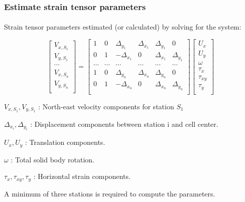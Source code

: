 \begin{frame}
 \frametitle{Estimate strain tensor parameters}
 \framesubtitle{}
 \label{ch2:}
 
 Strain tensor parameters estimated (or calculated) by solving for the system:
 
 \[
  \begin{bmatrix}
    V_{x,S_1} \\ 
    V_{y,S_1} \\ 
    \cdots \\ 
    V_{x,S_n} \\ 
    V_{y,S_n} \\ 
  \end{bmatrix}
  =
  \begin{bmatrix}
    1 & 0 & \Delta_{y_1}  & \Delta_{x_1} & \Delta_{y_1} & 0 \\
    0 & 1 & -\Delta_{x_1} &  0           & \Delta_{x_1} & \Delta_{y_1} \\
    \cdots & \cdots & \cdots & \cdots & \cdots & \cdots \\
    1 & 0 & \Delta_{y_n}  & \Delta_{x_n} & \Delta_{y_n} & 0 \\
    0 & 1 & -\Delta_{x_n} &  0           & \Delta_{x_n} & \Delta_{y_n} \\
  \end{bmatrix}
  \begin{bmatrix}
    U_{x} \\ 
    U_{y} \\ 
    \omega \\ 
    \tau_{x} \\ 
    \tau_{xy} \\ 
    \tau_{y} \\ 
  \end{bmatrix}
  \]
  
  $V_{x,S_1}, V_{y,S_1}$ : North-east velocity components for station $S_1$
  
  $\Delta_{x_i}, \Delta_{y_i}$ : Displacement components between station i and cell center.
  
  $ U_{x},  U_{y} $ : Translation components.
  
  $\omega$ : Total solid body rotation.
  
  $ \tau_{x}, \tau_{xy}, \tau_{y} $ : Horizontal strain components.
  
  A minimum of three stations is required to compute the parameters.
  
  

\end{frame}
\note{}

